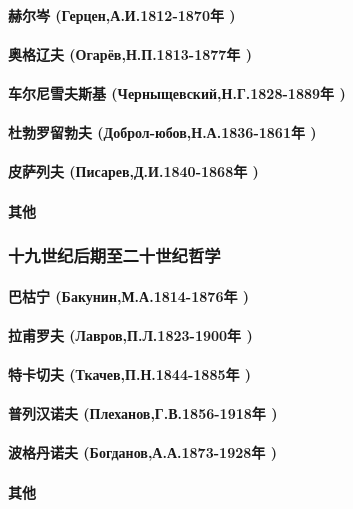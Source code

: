 \documentclass[UTF8]{../RepresentationUniverse}
\begin{document}
    \paragraph{赫尔岑 (Герцен,А.И.1812-1870年 )}
    \paragraph{奥格辽夫 (Огарёв,Н.П.1813-1877年 )}
    \paragraph{车尔尼雪夫斯基 (Черныщевский,Н.Г.1828-1889年 )}
    \paragraph{杜勃罗留勃夫 (Доброл-юбов,Н.А.1836-1861年 )}
    \paragraph{皮萨列夫 (Писарев,Д.И.1840-1868年 )}
    \paragraph{其他}

\subsubsection{十九世纪后期至二十世纪哲学}
    \paragraph{巴枯宁 (Бакунин,М.А.1814-1876年 )}
    \paragraph{拉甫罗夫 (Лавров,П.Л.1823-1900年 )}
    \paragraph{特卡切夫 (Ткачев,П.Н.1844-1885年 )}
    \paragraph{普列汉诺夫 (Плеханов,Г.В.1856-1918年 )}
    \paragraph{波格丹诺夫 (Богданов,А.А.1873-1928年 )}
    \paragraph{其他}
\end{document}
